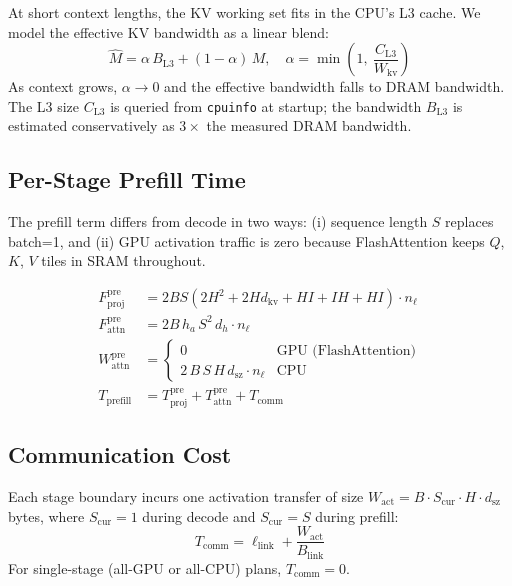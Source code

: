 \documentclass[lettersize,journal]{IEEEtran}
\begin{document}
At short context lengths, the KV working set fits in the CPU's L3 cache.
We model the effective KV bandwidth as a linear blend:
\begin{equation}
  \hat{M} = \alpha\,B_\text{L3} + (1-\alpha)\,M, \quad
  \alpha = \min\!\left(1,\ \frac{C_\text{L3}}{W_\text{kv}}\right)
  \label{eq:l3}
\end{equation}
As context grows, $\alpha \to 0$ and the effective bandwidth falls to DRAM
bandwidth. The L3 size $C_\text{L3}$ is queried from \texttt{cpuinfo} at
startup; the bandwidth $B_\text{L3}$ is estimated conservatively as
$3\times$ the measured DRAM bandwidth.

\subsection{Per-Stage Prefill Time}

The prefill term differs from decode in two ways: (i) sequence length $S$
replaces batch=1, and (ii) GPU activation traffic is zero because
FlashAttention keeps $Q$, $K$, $V$ tiles in SRAM throughout.

\begin{align}
  F^\text{pre}_\text{proj} &= 2BS\!\left(2H^2 + 2H d_\text{kv} + H I + IH + HI\right) \cdot n_\ell \\
  F^\text{pre}_\text{attn} &= 2B\,h_a\,S^2\,d_h \cdot n_\ell \\
  W^\text{pre}_\text{attn} &=
    \begin{cases}
      0 & \text{GPU (FlashAttention)} \\
      2\,B\,S\,H\,d_\text{sz} \cdot n_\ell & \text{CPU}
    \end{cases}\\
  T_\text{prefill} &= T^\text{pre}_\text{proj} + T^\text{pre}_\text{attn}
                      + T_\text{comm}
\end{align}

\subsection{Communication Cost}

Each stage boundary incurs one activation transfer of size
$W_\text{act} = B \cdot S_\text{cur} \cdot H \cdot d_\text{sz}$ bytes,
where $S_\text{cur} = 1$ during decode and $S_\text{cur} = S$ during
prefill:
\begin{equation}
  T_\text{comm} = \ell_\text{link} + \frac{W_\text{act}}{B_\text{link}}
  \label{eq:comm}
\end{equation}
For single-stage (all-GPU or all-CPU) plans, $T_\text{comm} = 0$.
\end{document}
